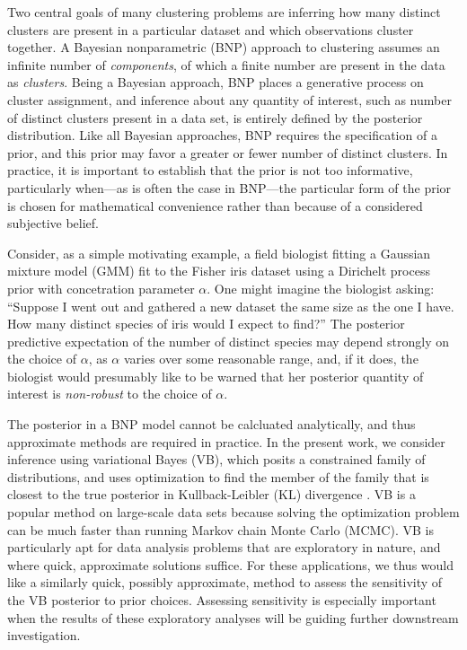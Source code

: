 Two central goals of many clustering problems are inferring how many distinct
clusters are present in a particular dataset and which observations cluster
together. A Bayesian nonparametric (BNP) approach to clustering assumes an
infinite number of \textit{components}, of which a finite number are present in
the data as \textit{clusters}. Being a Bayesian approach, BNP places a
generative process on cluster assignment, and inference about any quantity of
interest, such as number of distinct clusters present in a data set, is entirely
defined by the posterior distribution. Like all Bayesian approaches, BNP
requires the specification of a prior, and this prior may favor a greater or
fewer number of distinct clusters. In practice, it is important to establish
that the prior is not too informative, particularly when---as is often the case
in BNP---the particular form of the prior is chosen for mathematical convenience
rather than because of a considered subjective belief.

Consider, as a simple motivating example, a field biologist fitting a Gaussian
mixture model (GMM) fit to the Fisher iris dataset \citep{anderson:1936:iris,
fisher:1936:iris} using a Dirichelt process prior with concetration parameter
$\alpha$.  One might imagine the biologist asking: ``Suppose I went out and
gathered a new dataset the same size as the one I have.  How many distinct
species of iris would I expect to find?''  The posterior predictive expectation
of the number of distinct species may depend strongly on the choice of $\alpha$,
as $\alpha$ varies over some reasonable range, and, if it does, the biologist
would presumably like to be warned that her posterior quantity of interest is
{\em non-robust} to the choice of $\alpha$.

The posterior in a BNP model cannot be calcluated analytically, and thus
approximate methods are required in practice. In the present work, we consider
inference using variational Bayes (VB), which posits a constrained family of
distributions, and uses optimization to find the member of the family that is
closest to the true posterior in Kullback-Leibler ($\mathrm{KL}$) divergence
\citep{jordan:1999:vi, wainwright:2008:graphical_models, blei:2017:vi_review}.
VB is a popular method on large-scale data sets because solving the optimization
problem can be much faster than running Markov chain Monte Carlo (MCMC). VB is
particularly apt for data analysis problems that are exploratory in nature, and
where quick, approximate solutions suffice. For these applications, we thus
would like a similarly quick, possibly approximate, method to assess the
sensitivity of the VB posterior to prior choices. Assessing sensitivity is
especially important when the results of these exploratory analyses will be
guiding further downstream investigation.

